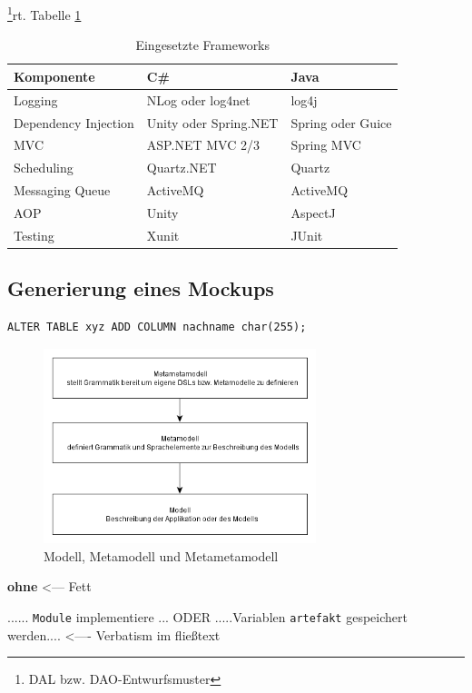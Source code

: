 \documentclass[a4paper,12pt]{scrreprt}
\begin{document}
\footnote{DAL bzw. DAO-Entwurfsmuster}rt. 
Tabelle \ref{frameworks} 


\begin{table}[h]
\begin{tabular}{l|l|l}
Komponente 	& 		C\# 		&	 Java\\
\hline
Logging 	& NLog oder log4net & log4j \\
Dependency Injection & Unity oder Spring.NET & Spring oder Guice \\
MVC & ASP.NET MVC 2/3 & Spring MVC \\
Scheduling 	& Quartz.NET 		& Quartz 	\\
Messaging Queue & ActiveMQ 		& ActiveMQ 	 \\
AOP & Unity & AspectJ \\
Testing & Xunit & JUnit \\
\end{tabular}
\caption{\label{frameworks}Eingesetzte Frameworks}
\end{table}


\subsection{Generierung eines Mockups}
\label{sub:gen_prototyp}

\begin{verbatim}
ALTER TABLE xyz ADD COLUMN nachname char(255);
\end{verbatim}




\begin{figure}[h]
	\centering
		\includegraphics[width=300px]{diagramme/meta-meta-modell.png}
		\caption{Modell,  Metamodell und Metametamodell}
		\label{fig:meta-meta-modell}
\end{figure}


\textbf{ohne} <--- Fett

...... \verb+Module+ implementiere ...   ODER .....Variablen \verb-artefakt- gespeichert werden.... <----  Verbatism im fließtext
\end{document}
